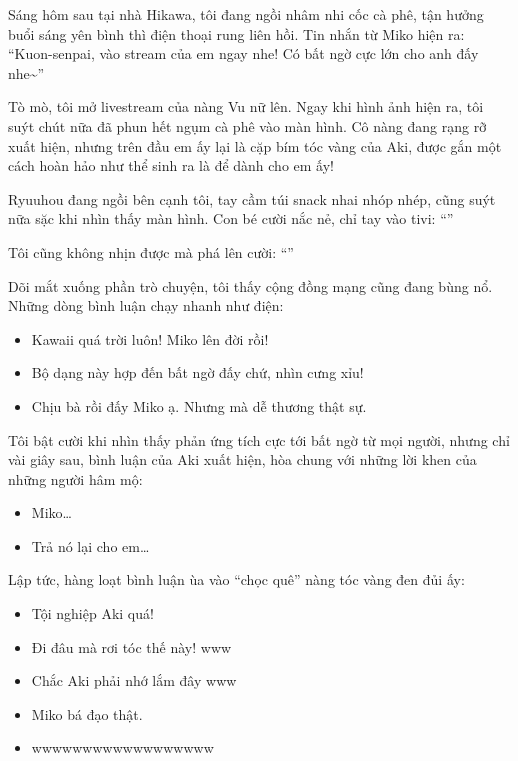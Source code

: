 \documentclass[../main.tex]{subfiles}
\begin{document}
Sáng hôm sau tại nhà Hikawa, tôi đang ngồi nhâm nhi cốc cà phê, tận hưởng buổi sáng yên bình thì điện thoại rung liên hồi. Tin nhắn từ Miko hiện ra: ``Kuon-senpai, vào stream của em ngay nhe! Có bất ngờ cực lớn cho anh đấy nhe\~{}''

Tò mò, tôi mở livestream của nàng Vu nữ lên. Ngay khi hình ảnh hiện ra, tôi suýt chút nữa đã phun hết ngụm cà phê vào màn hình. Cô nàng đang rạng rỡ xuất hiện, nhưng trên đầu em ấy lại là cặp bím tóc vàng của Aki, được gắn một cách hoàn hảo như thể sinh ra là để dành cho em ấy!

Ryuuhou đang ngồi bên cạnh tôi, tay cầm túi snack nhai nhóp nhép, cũng suýt nữa sặc khi nhìn thấy màn hình. Con bé cười nắc nẻ, chỉ tay vào tivi: ``''


Tôi cũng không nhịn được mà phá lên cười: ``''

Dõi mắt xuống phần trò chuyện, tôi thấy cộng đồng mạng cũng đang bùng nổ. Những dòng bình luận chạy nhanh như điện:

\begin{itemize}
  \item Kawaii quá trời luôn! Miko lên đời rồi!
  \item Bộ dạng này hợp đến bất ngờ đấy chứ, nhìn cưng xỉu!
  \item Chịu bà rồi đấy Miko ạ. Nhưng mà dễ thương thật sự.
\end{itemize}

Tôi bật cười khi nhìn thấy phản ứng tích cực tới bất ngờ từ mọi người, nhưng chỉ vài giây sau, bình luận của Aki xuất hiện, hòa chung với những lời khen của những người hâm mộ:

\begin{itemize}
  \item Miko\dots
  \item Trả nó lại cho em\dots
\end{itemize}

Lập tức, hàng loạt bình luận ùa vào ``chọc quê'' nàng tóc vàng đen đủi ấy:

\begin{itemize}
  \item Tội nghiệp Aki quá!
  \item Đi đâu mà rơi tóc thế này! www
  \item Chắc Aki phải nhớ lắm đây www
  \item Miko bá đạo thật.
  \item wwwwwwwwwwwwwwwwww
\end{itemize}
\end{document}
